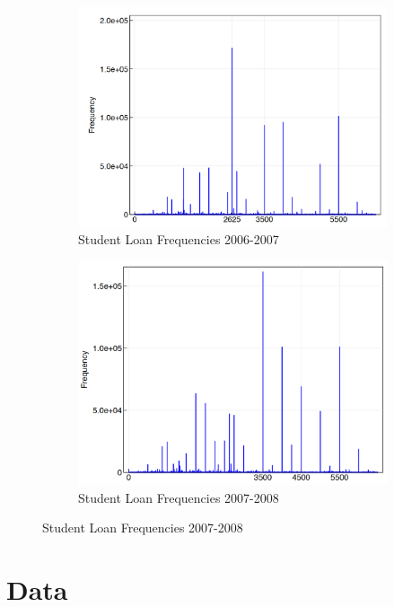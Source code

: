 \documentclass{article}
\begin{document}
	
	\begin{figure}
		\centering
		\caption{Student Loan Frequencies From NY Fed CCP/Equifax Panel as Presented in \textcite{lucca2018}.}
		\label{luc}
		\begin{subfigure}{0.49\textwidth}
		\centering
		\caption{Student Loan Frequencies 2006-2007}
		\label{luc06}
		\includegraphics[width = \linewidth]{Lucca6a.png}
		\end{subfigure} 
	\begin{subfigure}{0.49\textwidth}
		\centering
		\caption{Student Loan Frequencies 2007-2008}
		\label{luc07}
		\includegraphics[width = \linewidth]{Lucca6b.png}
		\end{subfigure}
	\end{figure}
	
	\section{Data}
	
\end{document}

